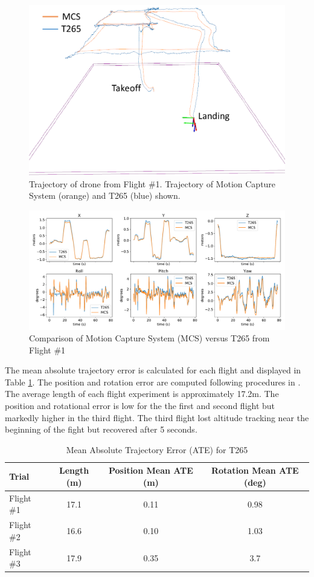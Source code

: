 \begin{figure}[!ht]
    \centering  
    \includegraphics[page=1,clip,trim=0cm 0cm 0cm 0cm,width=.45\linewidth]{chapter_7_experiments/imgs/flight_path_t265_mcs.pdf}
    \caption[Trajectory of drone from Flight \#1. ]{Trajectory of drone from Flight \#1. Trajectory of Motion Capture System (orange) and T265 (blue) shown. }\label{fig:ch7_flight_path_3d}
\end{figure}

\begin{figure}[!ht]
    \centering  
    \includegraphics[page=1,clip,trim=0cm 0cm 0cm 0cm,width=.95\linewidth]{chapter_7_experiments/imgs/t265_gt_graphs_v2.pdf}
    \caption[Comparison of Motion Capture System (MCS) versus T265 from Flight \#1]{Comparison of Motion Capture System (MCS) versus T265 from Flight \#1}\label{fig:ch7_t265}
\end{figure}
The mean absolute trajectory error is calculated for each flight and displayed in Table \ref{table:ch7_ate}. The position and rotation error are computed following procedures in \cite{zhang_tutorial_2018}. The average length of each flight experiment is approximately 17.2m. The position and rotational error is low for the the first and second flight but markedly higher in the third flight. The third flight lost altitude tracking near the beginning of the fight but recovered after 5 seconds.

\begin{table}[h]
\centering
\caption{Mean Absolute Trajectory Error (ATE) for T265}\label{table:ch7_ate}
\begin{tabular}{@{}lccc@{}}
\toprule
Trial    & Length (m) & Position Mean ATE (m) & Rotation Mean ATE (deg) \\ \midrule
Flight \#1 & 17.1       & 0.11                  & 0.98                    \\
Flight \#2 & 16.6       & 0.10                  & 1.03                    \\
Flight \#3 & 17.9       & 0.35                  & 3.7                     \\ \bottomrule
\end{tabular}
\end{table}


